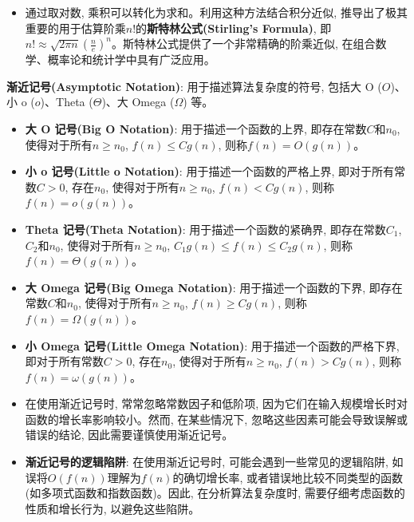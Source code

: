 \documentclass[12pt, a4paper, UTF8]{ctexart}
\newcommand{\term}[1]{\textbf{\textcolor{blue!80!black}{#1}}}
\newcommand{\emphb}[1]{\textbf{#1}}
\begin{document}
\begin{sloppypar}
\begin{itemize}[nosep]
        \item 通过取对数, 乘积可以转化为求和。利用这种方法结合积分近似, 推导出了极其重要的用于估算阶乘$n!$的\term{斯特林公式(Stirling's Formula)}, 即$n! \approx \sqrt{2\pi n} \left( \frac{n}{e} \right)^n$。斯特林公式提供了一个非常精确的阶乘近似, 在组合数学、概率论和统计学中具有广泛应用。
    \end{itemize}
    \term{渐近记号(Asymptotic Notation)}: 用于描述算法复杂度的符号, 包括大 O ($O$)、小 o ($o$)、Theta ($\Theta$)、大 Omega ($\Omega$) 等。
    \begin{itemize}[nosep]
        \item \term{大 O 记号(Big O Notation)}: 用于描述一个函数的上界, 即存在常数$C$和$n_0$, 使得对于所有$n \geq n_0$, $f(n) \leq C g(n)$, 则称$f(n) = O(g(n))$。
        \item \term{小 o 记号(Little o Notation)}: 用于描述一个函数的严格上界, 即对于所有常数$C > 0$, 存在$n_0$, 使得对于所有$n \geq n_0$, $f(n) < C g(n)$, 则称$f(n) = o(g(n))$。
        \item \term{Theta 记号(Theta Notation)}: 用于描述一个函数的紧确界, 即存在常数$C_1$, $C_2$和$n_0$, 使得对于所有$n \geq n_0$, $C_1 g(n) \leq f(n) \leq C_2 g(n)$, 则称$f(n) = \Theta(g(n))$。
        \item \term{大 Omega 记号(Big Omega Notation)}: 用于描述一个函数的下界, 即存在常数$C$和$n_0$, 使得对于所有$n \geq n_0$, $f(n) \geq C g(n)$, 则称$f(n) = \Omega(g(n))$。
        \item \term{小 Omega 记号(Little Omega Notation)}: 用于描述一个函数的严格下界, 即对于所有常数$C > 0$, 存在$n_0$, 使得对于所有$n \geq n_0$, $f(n) > C g(n)$, 则称$f(n) = \omega(g(n))$。
        \item 在使用渐近记号时, 常常忽略常数因子和低阶项, 因为它们在输入规模增长时对函数的增长率影响较小。然而, 在某些情况下, 忽略这些因素可能会导致误解或错误的结论, 因此需要谨慎使用渐近记号。
        \item \emphb{渐近记号的逻辑陷阱}: 在使用渐近记号时, 可能会遇到一些常见的逻辑陷阱, 如误将$O(f(n))$理解为$f(n)$的确切增长率, 或者错误地比较不同类型的函数(如多项式函数和指数函数)。因此, 在分析算法复杂度时, 需要仔细考虑函数的性质和增长行为, 以避免这些陷阱。
    \end{itemize}
    \newpage


\end{sloppypar}
\end{document}
